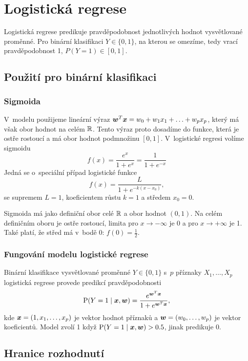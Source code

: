 \section{Logistická regrese}

Logistická regrese predikuje pravděpodobnost jednotlivých hodnot vysvětlované proměnné. Pro binární klasifikaci $Y \in \{0, 1\}$, na kterou se omezíme, tedy vrací pravděpodobnost 1, $P(Y = 1) \in [0, 1]$.

\subsection{Použití pro binární klasifikaci}

\subsubsection{Sigmoida}

V~modelu použijeme lineární výraz $\bm{w}^T\bm{x} = w_0 + w_1 x_1 + \ldots + w_p x_p$, který má však obor hodnot na celém $\mathbb{R}$. Tento výraz proto dosadíme do funkce, která je ostře rostoucí a má obor hodnot podmnožinu $[0, 1]$. V~logistické regresi volíme sigmoidu
\[f(x) = \frac{e^x}{1+e^x} = \frac{1}{1+e^{-x}}\]
Jedná se o~speciální případ logistické funkce
\[f(x) = \frac{L}{1 + e^{-k(x-x_0)}},\]
se supremem $L=1$, koeficientem růstu $k=1$ a středem $x_0 = 0$.

Sigmoida má jako definiční obor celé $\mathbb{R}$ a obor hodnot $(0, 1)$. Na celém definičním oboru je ostře rostoucí, limita pro $x \rightarrow -\infty$ je 0 a pro $x \rightarrow +\infty$ je 1. Také platí, že střed má v~bodě 0: $f(0) = \frac{1}{2}$.

\subsubsection{Fungování modelu logistické regrese}

Binární klasifikace vysvětlované proměnné $Y \in \{0,1\}$ s~$p$ příznaky $X_1, \ldots, X_p$ logistická regrese provede predikcí pravděpodobnosti
\begin{equation*}
    \text{P} (Y=1 \mid \bm{x}, \bm{w} ) = \frac{e^{\bm{w}^T\bm{x}}}{1 + e^{\bm{w}^T\bm{x}}},
\end{equation*}
kde $\bm{x} = (1, x_1, \ldots, x_p)$ je vektor hodnot příznaků a $\bm{w} = (w_0, \ldots, w_p)$ je vektor koeficientů. Model zvolí 1 když $\text{P} (Y=1 \mid \bm{x}, \bm{w} ) > 0.5$, jinak predikuje 0.

\subsection{Hranice rozhodnutí}


